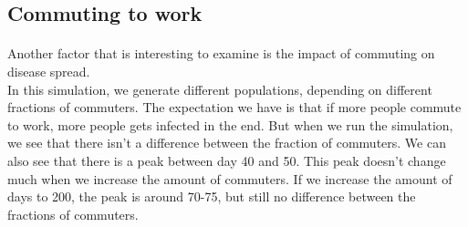 \documentclass[runningheads]{llncs}
\begin{document}
\newpage

\subsection{Commuting to work}

\paragraph{} Another factor that is interesting to examine is the impact of commuting on disease spread. \\
In this simulation, we generate different populations, depending on different fractions of commuters. The expectation we have is that if more people commute to work, more people gets infected in the end. But when we run the simulation, we see that there isn't a difference between the fraction of commuters. We can also see that there is a peak between day 40 and 50. This peak doesn't change much when we increase the amount of commuters. If we increase the amount of days to 200, the peak is around 70-75, but still no difference between the fractions of commuters. 
\end{document}
